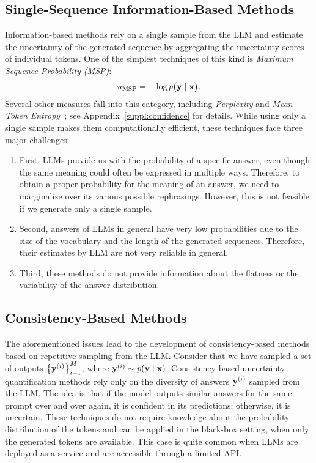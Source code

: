 \subsection{Single-Sequence Information-Based Methods}
  Information-based methods rely on a single sample from the LLM and estimate the uncertainty of the generated sequence by aggregating the uncertainty scores of individual tokens. One of the simplest techniques of this kind is
  \textit{Maximum Sequence Probability (MSP)}: 
  \begin{equation}
    u_{\text{MSP}} = - \log p\bigl(\mathbf{y} \mid \mathbf{x}\bigr).
  \end{equation}
  Several other measures fall into this category, including \textit{Perplexity} and \textit{Mean Token Entropy}~\citep{fomicheva-etal-2020-unsupervised}; see Appendix~\ref{suppl:confidence} for details. While using only a single sample makes them computationally efficient, these techniques face three major challenges:
  \begin{enumerate}
    \item First, LLMs provide us with the probability of a specific answer, even though the same meaning could often be expressed in multiple ways. Therefore, to obtain a proper probability for the meaning of an answer, we need to marginalize over its various possible rephrasings. However, this is not feasible if we generate only a single sample. 

    \item Second, answers of LLMs in general have very low probabilities due to the size of the vocabulary and the length of the generated sequences. Therefore, their estimates by LLM are not very reliable in general.

    \item Third, these methods do not provide information about the flatness or the variability of the answer distribution. 
  \end{enumerate}
  

\subsection{Consistency-Based Methods}
  The aforementioned issues lead to the development of consistency-based methods based on repetitive sampling from the LLM.
  Consider that we have sampled a set of outputs \( \bigl\{\mathbf{y}^{(i)}\bigr\}_{i=1}^M\), where \({\mathbf{y}^{(i)} \sim p(\mathbf{y} \mid \mathbf{x})}\). 
  Consistency-based uncertainty quantification methods rely only on the diversity of answers \(\mathbf{y}^{(i)}\) sampled from the LLM. The idea is that if the model outputs similar answers for the same prompt over and over again, it is confident in its predictions; otherwise, it is uncertain. These techniques do not require knowledge about the probability distribution of the tokens and can be applied in the black-box setting, when only the generated tokens are available. This case is quite common when LLMs are deployed as a service and are accessible through a limited API.
  
